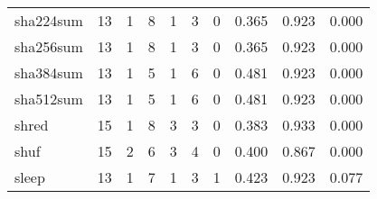\begin{longtable}{lp{1.3cm}p{1.3cm}p{1.3cm}p{1.3cm}p{1.3cm}p{1.3cm}p{1.3cm}p{1.3cm}p{1.3cm}}
sha224sum &                     13 &                                             1 &                                            8 &                                           1 &                                            3 &                                          0 &                                0.365 &                                  0.923 &                                0.000 \\
sha256sum &                     13 &                                             1 &                                            8 &                                           1 &                                            3 &                                          0 &                                0.365 &                                  0.923 &                                0.000 \\
sha384sum &                     13 &                                             1 &                                            5 &                                           1 &                                            6 &                                          0 &                                0.481 &                                  0.923 &                                0.000 \\
sha512sum &                     13 &                                             1 &                                            5 &                                           1 &                                            6 &                                          0 &                                0.481 &                                  0.923 &                                0.000 \\
shred     &                     15 &                                             1 &                                            8 &                                           3 &                                            3 &                                          0 &                                0.383 &                                  0.933 &                                0.000 \\
shuf      &                     15 &                                             2 &                                            6 &                                           3 &                                            4 &                                          0 &                                0.400 &                                  0.867 &                                0.000 \\
sleep     &                     13 &                                             1 &                                            7 &                                           1 &                                            3 &                                          1 &                                0.423 &                                  0.923 &                                0.077 \\

\end{longtable}
